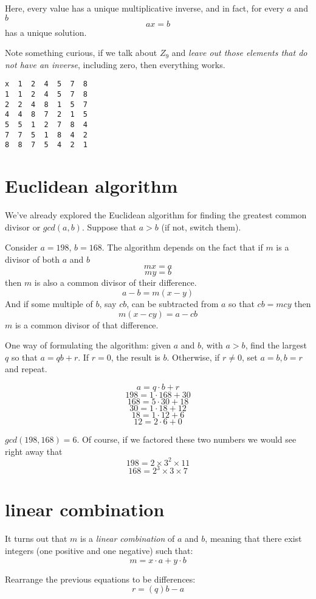 \documentclass[11pt, oneside]{article}
\begin{document}
Here, every value has a unique multiplicative inverse, and in fact, for every $a$ and $b$
\[ ax = b \]
has a unique solution.

Note something curious, if we talk about $Z_9$ and \emph {leave out those elements that do not have an inverse}, including zero, then everything works.

\begin{verbatim}
x  1  2  4  5  7  8
1  1  2  4  5  7  8
2  2  4  8  1  5  7
4  4  8  7  2  1  5
5  5  1  2  7  8  4
7  7  5  1  8  4  2        
8  8  7  5  4  2  1
\end{verbatim}

\section*{Euclidean algorithm}

We've already explored the Euclidean algorithm for finding the greatest common divisor or $gcd(a,b)$.  Suppose that $a > b$ (if not, switch them).  

Consider $a = 198$, $b = 168$.  The algorithm depends on the fact that if $m$ is a divisor of both $a$ and $b$
\[ mx = a \]
\[ my = b \]
then $m$ is also a common divisor of their difference.  
\[ a - b = m(x - y) \]
And if some multiple of $b$, say $cb$, can be subtracted from $a$ so that $cb = mcy$ then
\[ m(x - cy) = a - cb \]
$m$ is a common divisor of that difference.

One way of formulating the algorithm:  given $a$ and $b$, with $a > b$, find the largest $q$ so that $a = qb + r$.  If $r = 0$, the result is $b$.  Otherwise, if $r \ne 0$, set $a = b, b = r$ and repeat.

\[ a = q \cdot b + r \]
\[ 198 = 1 \cdot 168 + 30 \]
\[ 168 = 5 \cdot 30 + 18 \]
\[ 30 = 1 \cdot 18 + 12 \]
\[ 18 = 1 \cdot 12 + 6 \]
\[ 12 = 2 \cdot 6 + 0 \]

$gcd(198,168) = 6$.  Of course, if we factored these two numbers we would see right away that
\[ 198 = 2 \times 3^2 \times 11 \]
\[ 168 = 2^3 \times 3 \times 7 \]

\section*{linear combination}

It turns out that $m$ is a \emph{linear combination} of $a$ and $b$, meaning that there exist integers (one positive and one negative) such that:
\[ m = x \cdot a + y \cdot b \]

Rearrange the previous equations to be differences:
\[ r = (q)b - a \]
\end{document}
